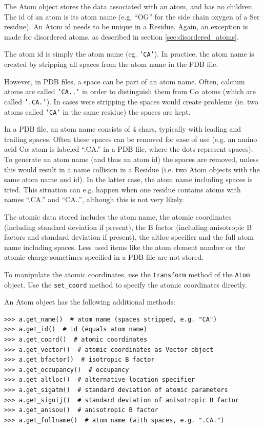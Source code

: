 The Atom object stores the data associated with an atom, and has no children.
The id of an atom is its atom name (e.g. ``OG'' for the side chain oxygen
of a Ser residue). An Atom id needs to be unique in a Residue. Again, an exception is made for disordered atoms, as described in section \ref{sec:disordered_atoms}.

The atom id is simply the atom name (eg. \texttt{'CA'}). In practice,
the atom name is created by stripping all spaces from the atom name
in the PDB file.

However, in PDB files, a space can be part of an atom name. Often,
calcium atoms are called \texttt{'CA..'} in order to distinguish them
from C$\alpha$ atoms (which are called \texttt{'.CA.'}). In cases
were stripping the spaces would create problems (ie. two atoms called
\texttt{'CA'} in the same residue) the spaces are kept.

In a PDB file, an atom name consists of 4 chars, typically with leading and
trailing spaces. Often these spaces can be removed for ease of use (e.g. an
amino acid C\( \alpha  \) atom is labeled ``.CA.'' in a PDB file, where
the dots represent spaces). To generate an atom name (and thus an atom id) the
spaces are removed, unless this would result in a name collision in a Residue
(i.e. two Atom objects with the same atom name and id). In the latter case,
the atom name including spaces is tried. This situation can e.g. happen when
one residue contains atoms with names ``.CA.'' and ``CA..'', although
this is not very likely.

The atomic data stored includes the atom name, the atomic coordinates (including
standard deviation if present), the B factor (including anisotropic B factors
and standard deviation if present), the altloc specifier and the full atom name
including spaces. Less used items like the atom element number or the atomic
charge sometimes specified in a PDB file are not stored.

To manipulate the atomic coordinates, use the \texttt{transform} method of
the \texttt{Atom} object. Use the \texttt{set\_coord} method to specify the
atomic coordinates directly.

An Atom object has the following additional methods:

\begin{verbatim}
>>> a.get_name()  # atom name (spaces stripped, e.g. "CA")
>>> a.get_id()  # id (equals atom name)
>>> a.get_coord()  # atomic coordinates
>>> a.get_vector()  # atomic coordinates as Vector object
>>> a.get_bfactor()  # isotropic B factor
>>> a.get_occupancy()  # occupancy
>>> a.get_altloc()  # alternative location specifier
>>> a.get_sigatm()  # standard deviation of atomic parameters
>>> a.get_siguij()  # standard deviation of anisotropic B factor
>>> a.get_anisou()  # anisotropic B factor
>>> a.get_fullname()  # atom name (with spaces, e.g. ".CA.")
\end{verbatim}


